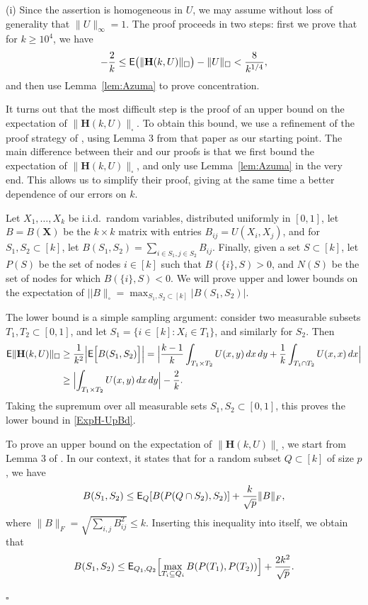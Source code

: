 \documentclass[12pt]{article}
\numberwithin{equation}{section}
\newenvironment{proof}{\medskip\noindent{\bf Proof.
}}{\hfill$\square$\medskip}
\def\E{{\sf E}}
\def\bH{{\mathbf H}}
\def\bX{{\mathbf X}}
\begin{document}
\begin{proof}
(i) Since the assertion is homogeneous in $U$, we may assume without
loss of generality that $\|U\|_\infty=1$. The proof proceeds in two
steps: first we prove that for $k\geq 10^4$, we have
\begin{equation}
\label{ExpH-UpBd} -\frac 2k \leq
\E\bigl(\|\bH(k,U)\|_\square\bigr)-\|U\|_\square < \frac 8{k^{1/4}},
\end{equation}
and then use Lemma~\ref{lem:Azuma} to prove concentration.

It turns out that the most difficult step is the proof of an upper
bound on the expectation of $\|\bH(k,U)\|_\square $.  To obtain this
bound, we use a refinement of the proof strategy of
\cite{AFKK}, using  Lemma 3 from that paper as our  starting
point. The main difference between their and our proofs is that we
first bound the expectation of $\|\bH(k,U)\|_\square $, and only  use
Lemma~\ref{lem:Azuma} in the very end. This allows us to simplify
their proof, giving at the same time a better dependence of our
errors on $k$.

Let $X_1,\dots,X_k$ be i.i.d.~random variables, distributed uniformly
in $[0,1]$, let $B=B({\bX})$ be the $k\times k$ matrix with entries
$B_{ij}=U(X_i,X_j)$, and for $S_1,S_2\subset [k]$, let $B(S_1,S_2)=
\sum_{i\in S_1,j\in S_2} B_{ij}$. Finally, given a set $S\subset
[k]$, let $P(S)$ be the set of nodes $i\in [k]$ such that
$B(\{i\},S)>0$, and $N(S)$ be the set of nodes for which
$B(\{i\},S)<0$.  We will prove upper and lower bounds on the
expectation of $||B\|_\square =\max_{S_1,S_2\subset
[k]}|B(S_1,S_2)|$.

The lower bound is a simple sampling argument: consider two
measurable subsets $T_1,T_2\subset [0,1]$, and let $S_1=\{i\in
[k]\colon X_i\in T_1\}$, and similarly for $S_2$.  Then
\[
\begin{aligned}
\E\|\bH(k,U)\|_\square &\geq\frac
1{k^{2}}\Bigl|\E\Bigl[B(S_1,S_2)\Bigr]\Bigr|
= \Bigl| \frac{k-1}k\int_{T_1\times T_2} U(x,y)\,dx\,dy + \frac
1k\int_{T_1\cap T_2} U(x,x)\,dx\Bigr|
\\
&\geq \Bigl| \int_{T_1\times T_2} U(x,y)\,dx\,dy \Bigr|-\frac 2k.
\end{aligned}
\]
Taking the supremum over all measurable sets
${S}_1,{S}_2\subset [0,1]$, this proves the lower bound in
\eqref{ExpH-UpBd}.

To prove an upper bound on the expectation of
$\|\bH(k,U)\|_\square$, we start from Lemma 3 of \cite{AFKK}.  In
our context, it states that for a random subset $Q\subset [k]$ of
size $p$, we have
\[
B(S_1,S_2)\leq \E_Q[B(P(Q\cap S_2),S_2)]
+\frac k{\sqrt p}\|B\|_F,
\]
where $\|B\|_F=\sqrt{\sum_{i,j}B_{ij}^2}\le k$. Inserting this
inequality into itself, we obtain that
\[
B(S_1,S_2) \leq \E_{Q_1,Q_2}\Bigl[ \max_{T_i\subseteq Q_i}
B(P(T_1),P(T_2))\Bigr] +\frac {2k^2}{\sqrt p}.
\]


\end{proof}
\end{document}
